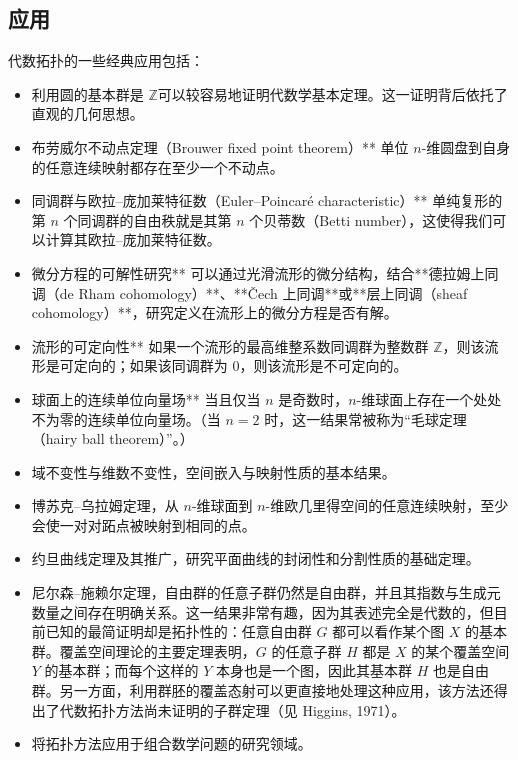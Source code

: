 \subsection{应用}
代数拓扑的一些经典应用包括：
\begin{itemize}
\item 利用圆的基本群是 $\mathbb{Z}$可以较容易地证明代数学基本定理。这一证明背后依托了直观的几何思想。

\item 布劳威尔不动点定理（Brouwer fixed point theorem）**
  单位 $n$-维圆盘到自身的任意连续映射都存在至少一个不动点。

\item 同调群与欧拉–庞加莱特征数（Euler–Poincaré characteristic）**
  单纯复形的第 $n$ 个同调群的自由秩就是其第 $n$ 个贝蒂数（Betti number），这使得我们可以计算其欧拉–庞加莱特征数。

\item 微分方程的可解性研究**
  可以通过光滑流形的微分结构，结合**德拉姆上同调（de Rham cohomology）**、**Čech 上同调**或**层上同调（sheaf cohomology）**，研究定义在流形上的微分方程是否有解。

\item 流形的可定向性**
  如果一个流形的最高维整系数同调群为整数群 $\mathbb{Z}$，则该流形是可定向的；如果该同调群为 $0$，则该流形是不可定向的。

\item 球面上的连续单位向量场**
  当且仅当 $n$ 是奇数时，$n$-维球面上存在一个处处不为零的连续单位向量场。（当 $n=2$ 时，这一结果常被称为“毛球定理（hairy ball theorem）”。）
\item 域不变性与维数不变性，空间嵌入与映射性质的基本结果。
\item 博苏克–乌拉姆定理，从 $n$-维球面到 $n$-维欧几里得空间的任意连续映射，至少会使一对对跖点被映射到相同的点。
\item 约旦曲线定理及其推广，研究平面曲线的封闭性和分割性质的基础定理。
\item 尼尔森–施赖尔定理，自由群的任意子群仍然是自由群，并且其指数与生成元数量之间存在明确关系。这一结果非常有趣，因为其表述完全是代数的，但目前已知的最简证明却是拓扑性的：任意自由群 $G$ 都可以看作某个图 $X$ 的基本群。覆盖空间理论的主要定理表明，$G$ 的任意子群 $H$ 都是 $X$ 的某个覆盖空间 $Y$ 的基本群；而每个这样的 $Y$ 本身也是一个图，因此其基本群 $H$ 也是自由群。另一方面，利用群胚的覆盖态射可以更直接地处理这种应用，该方法还得出了代数拓扑方法尚未证明的子群定理（见 Higgins, 1971）。
\item 将拓扑方法应用于组合数学问题的研究领域。
\end{itemize}